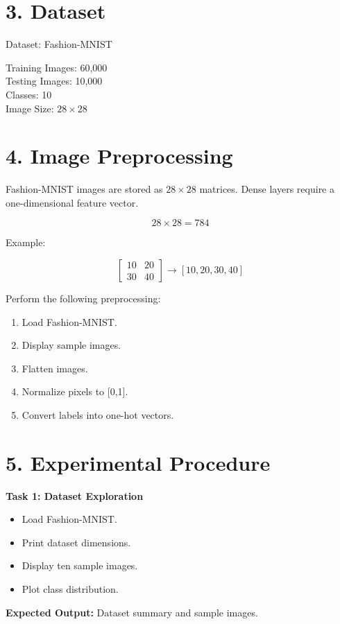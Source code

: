 \documentclass[11pt]{article}
\begin{document}
\section*{3. Dataset}
Dataset: Fashion-MNIST

Training Images: 60,000 \\
Testing Images: 10,000 \\
Classes: 10 \\
Image Size: $28\times28$

\section*{4. Image Preprocessing}

Fashion-MNIST images are stored as $28\times28$ matrices. Dense layers require a one-dimensional feature vector.

\[
28\times28=784
\]

Example:

\[
\begin{bmatrix}
10&20\\30&40
\end{bmatrix}
\rightarrow
[10,20,30,40]
\]

Perform the following preprocessing:

\begin{enumerate}
\item Load Fashion-MNIST.
\item Display sample images.
\item Flatten images.
\item Normalize pixels to [0,1].
\item Convert labels into one-hot vectors.
\end{enumerate}

\section*{5. Experimental Procedure}

\textbf{Task 1: Dataset Exploration}
\begin{itemize}
\item Load Fashion-MNIST.
\item Print dataset dimensions.
\item Display ten sample images.
\item Plot class distribution.
\end{itemize}

\textbf{Expected Output:}
Dataset summary and sample images.
\end{document}
